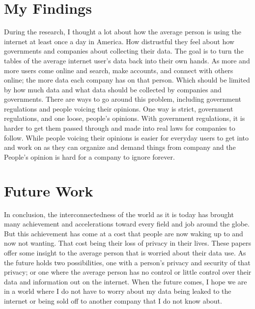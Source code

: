 \documentclass[10.5pt, twoside,twocolumn]{article}
\begin{document}





\section{My Findings}
During the research, I thought a lot about how the average person is using the internet at least once a day in America. How distrustful they feel about how governments and companies about collecting their data. The goal is to turn the tables of the average internet user's data back into their own hands. As more and more users come online and search, make accounts, and connect with others online; the more data each company has on that person. Which should be limited by how much data and what data should be collected by companies and governments. There are ways to go around this problem, including government regulations and people voicing their opinions. One way is strict, government regulations, and one loose, people's opinions. With government regulations, it is harder to get them passed through and made into real laws for companies to follow. While people voicing their opinions is easier for everyday users to get into and work on as they can organize and demand things from company and the People's opinion is hard for a company to ignore forever.


\section{Future Work}
In conclusion, the interconnectedness of the world as it is today has brought many achievement and accelerations toward every field and job around the globe. But this achievement has come at a cost that people are now waking up to and now not wanting. That cost being their loss of privacy in their lives. These papers offer some insight to the average person that is worried about their data use. As the future holds two possibilities, one with a person's privacy and security of that privacy; or one where the average person has no control or little control over their data and information out on the internet. When the future comes, I hope we are in a world where I do not have to worry about my data being leaked to the internet or being sold off to another company that I do not know about.


\printbibliography %

\end{document}
